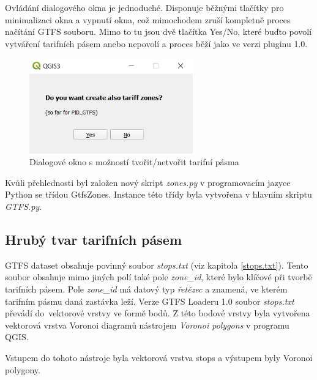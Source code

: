 Ovládání dialogového okna je jednoduché. Disponuje běžnými tlačítky pro minimalizaci okna a vypnutí okna, což mimochodem
zruší kompletně proces načítání GTFS souboru. Mimo to tu jsou dvě tlačítka Yes/No, které buďto povolí vytváření tarifních
pásem anebo nepovolí a proces běží jako ve verzi pluginu 1.0.

\begin{figure}[H] \centering
    \includegraphics[width=200pt]{./pictures/dialog.png}
    \caption[Dialogové okno s možností tvořit/netvořit tarifní pásma]{Dialogové okno s možností tvořit/netvořit tarifní pásma}
	\label{fig:dialog}                                
\end{figure}

Kvůli přehlednosti byl založen nový skript \textit{zones.py} v programovacím jazyce Python se třídou GtfsZones. 
Instance této třídy byla vytvořena v hlavním skriptu \textit{GTFS.py}.

\subsection{Hrubý tvar tarifních pásem}
\label{hruby_tvar}

GTFS dataset obsahuje povinný  soubor \textit{stops.txt} (viz kapitola \ref{stops.txt}). Tento soubor obsahuje mimo
jiných polí také pole \textit{zone\_id}, které bylo klíčové při tvorbě tarifních pásem.
Pole \textit{zone\_id} má datový typ \textit{řetězec} a znamená, ve kterém ta\-rifním
pásmu daná zastávka leží. Verze GTFS Loaderu 1.0 soubor \textit{stops.txt} převádí do~vektorové vrstvy
ve formě bodů. Z této bodové vrstvy byla vytvořena vektorová vrstva Voronoi 
diagramů nástrojem \textit{Voronoi polygons} v programu QGIS. 

Vstupem do tohoto nástroje byla vektorová vrstva stops a výstupem byly Voronoi polygony.

